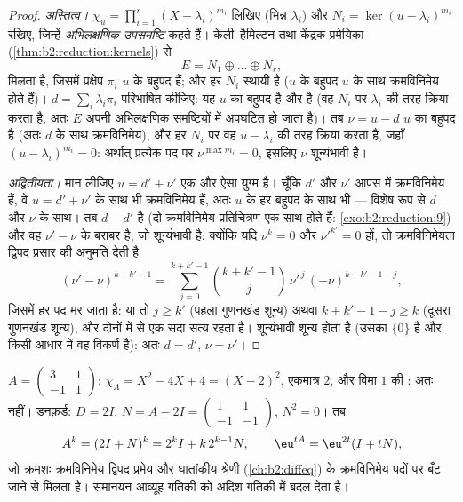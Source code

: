 \begin{proof}
\emph{अस्तित्व।} $\chi_u = \prod_{i=1}^{r} (X -
\lambda_i)^{m_i}$ लिखिए (भिन्न $\lambda_i$) और $N_i = \ker(u -
\lambda_i)^{m_i}$ रखिए, जिन्हें
\emph{अभिलक्षणिक उपसमष्टि} कहते हैं। केली--हैमिल्टन तथा केंद्रक
प्रमेयिका (\cref{thm:b2:reduction:kernels}) से
\[
E = N_1 \oplus \dots \oplus N_r ,
\]
मिलता है, जिसमें प्रक्षेप $\pi_i$ $u$ के बहुपद हैं; और हर $N_i$ स्थायी है
($u$ के बहुपद $u$ के साथ क्रमविनिमेय होते हैं)। $d = \sum_i \lambda_i
\pi_i$ परिभाषित कीजिए:
यह $u$ का बहुपद है और  है (वह $N_i$ पर $\lambda_i$ की तरह क्रिया
करता है, अतः $E$ अपनी अभिलक्षणिक समष्टियों में अपघटित हो जाता है)। तब
$\nu = u -
d$ $u$ का बहुपद है (अतः $d$ के साथ क्रमविनिमेय), और हर $N_i$ पर वह
$u - \lambda_i$ की तरह क्रिया करता है, जहाँ $(u - \lambda_i)^{m_i} = 0$: अर्थात् प्रत्येक पद पर $\nu^{\max m_i} = 0$,
इसलिए $\nu$ शून्यंभावी है।

\emph{अद्वितीयता।} मान लीजिए $u = d' + \nu'$ एक और ऐसा युग्म है। चूँकि $d'$ और $\nu'$
आपस में क्रमविनिमेय हैं, वे $u = d' +
\nu'$ के साथ भी क्रमविनिमेय हैं, अतः $u$ के
हर बहुपद के साथ भी --- विशेष रूप से $d$ और $\nu$ के साथ। तब $d - d'$
 है (दो क्रमविनिमेय  प्रतिचित्रण एक साथ 
होते हैं: \cref{exo:b2:reduction:9}) और वह $\nu' - \nu$ के बराबर है, जो शून्यंभावी है: क्योंकि यदि
$\nu^k = 0$ और $\nu'^{k'} = 0$ हों, तो क्रमविनिमेयता द्विपद प्रसार की अनुमति देती है
\[
(\nu' - \nu)^{k + k' - 1}
= \sum_{j=0}^{k+k'-1}\binom{k + k' - 1}{j}
\,\nu'^{\,j}\,(-\nu)^{k + k' - 1 - j} ,
\]
जिसमें हर पद मर जाता है: या तो $j \geq k'$ (पहला गुणनखंड शून्य) अथवा $k + k' - 1 - j \geq k$
(दूसरा गुणनखंड शून्य), और दोनों में से एक सदा सत्य रहता है। 
शून्यंभावी शून्य होता है (उसका  $\{0\}$ है और किसी आधार में वह
विकर्ण है): अतः $d = d'$, $\nu = \nu'$।
\end{proof}

\begin{example}[घातें और घातांकीय]\label{ex:b2:reduction:powers}
$A = \begin{pmatrix} 3 & 1\\ -1 & 1\end{pmatrix}$: $\chi_A = X^2 -
4X + 4 = (X-2)^2$, एकमात्र  $2$, और विमा $1$ की : अतः  नहीं। डनफ़र्ड: $D = 2I$, $N = A - 2I =
\begin{pmatrix} 1 & 1\\ -1 & -1\end{pmatrix}$, $N^2 = 0$। तब
\[
A^k = (2I + N)^k = 2^k I + k\,2^{k-1} N ,
\qquad
\eu^{tA} = \eu^{2t}(I + tN),
\]
जो क्रमशः क्रमविनिमेय द्विपद प्रमेय और घातांकीय श्रेणी (\cref{ch:b2:diffeq}) के
क्रमविनिमेय पदों पर बँट जाने से मिलता है। समानयन आव्यूह गतिकी को अदिश
गतिकी में बदल देता है।
\end{example}

